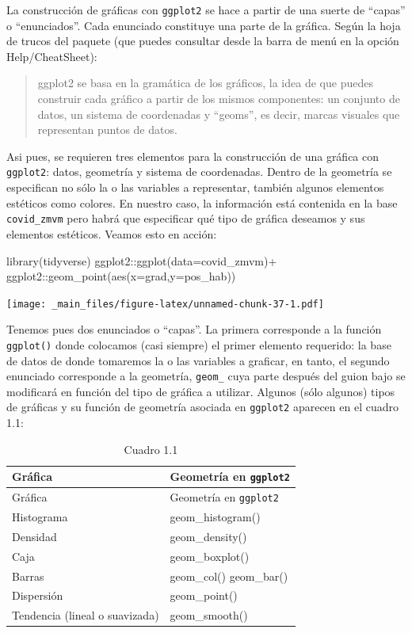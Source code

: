\documentclass[
  11pt,
  oneside]{book}
\newenvironment{Shaded}{\begin{snugshade}}{\end{snugshade}}
\newcommand{\AttributeTok}[1]{\textcolor[rgb]{0.77,0.63,0.00}{#1}}
\newcommand{\FunctionTok}[1]{\textcolor[rgb]{0.00,0.00,0.00}{#1}}
\newcommand{\NormalTok}[1]{#1}
\newcommand{\SpecialCharTok}[1]{\textcolor[rgb]{0.00,0.00,0.00}{#1}}
\begin{document}
La construcción de gráficas con \texttt{ggplot2} se hace a partir de una suerte de ``capas'' o ``enunciados''. Cada enunciado constituye una parte de la gráfica. Según la hoja de trucos del paquete (que puedes consultar desde la barra de menú en la opción Help/CheatSheet):

\begin{quote}
ggplot2 se basa en la gramática de los gráficos, la idea de que puedes construir cada gráfico a partir de los mismos componentes: un conjunto de datos, un sistema de coordenadas y ``geoms'', es decir, marcas visuales que representan puntos de datos.
\end{quote}

Asi pues, se requieren tres elementos para la construcción de una gráfica con \texttt{ggplot2}: datos, geometría y sistema de coordenadas. Dentro de la geometría se especifican no sólo la o las variables a representar, también algunos elementos estéticos como colores. En nuestro caso, la información está contenida en la base \texttt{covid\_zmvm} pero habrá que especificar qué tipo de gráfica deseamos y sus elementos estéticos. Veamos esto en acción:

\begin{Shaded}
\begin{Highlighting}[]
\FunctionTok{library}\NormalTok{(tidyverse)}
\NormalTok{ggplot2}\SpecialCharTok{::}\FunctionTok{ggplot}\NormalTok{(}\AttributeTok{data=}\NormalTok{covid\_zmvm)}\SpecialCharTok{+}
\NormalTok{  ggplot2}\SpecialCharTok{::}\FunctionTok{geom\_point}\NormalTok{(}\FunctionTok{aes}\NormalTok{(}\AttributeTok{x=}\NormalTok{grad,}\AttributeTok{y=}\NormalTok{pos\_hab))}
\end{Highlighting}
\end{Shaded}

\texttt{[image: \_main\_files/figure-latex/unnamed-chunk-37-1.pdf]}

Tenemos pues dos enunciados o ``capas''. La primera corresponde a la función \texttt{ggplot()} donde colocamos (casi siempre) el primer elemento requerido: la base de datos de donde tomaremos la o las variables a graficar, en tanto, el segundo enunciado corresponde a la geometría, \texttt{geom\_} cuya parte después del guion bajo se modificará en función del tipo de gráfica a utilizar. Algunos (sólo algunos) tipos de gráficas y su función de geometría asociada en \texttt{ggplot2} aparecen en el cuadro 1.1:

\begin{longtable}[]{@{}ll@{}}
\caption{Cuadro 1.1}\tabularnewline
\toprule()
Gráfica & Geometría en \texttt{ggplot2} \\
\midrule()
\endfirsthead
\toprule()
Gráfica & Geometría en \texttt{ggplot2} \\
\midrule()
\endhead
Histograma & geom\_histogram() \\
Densidad & geom\_density() \\
Caja & geom\_boxplot() \\
Barras & geom\_col() geom\_bar() \\
Dispersión & geom\_point() \\
Tendencia (lineal o suavizada) & geom\_smooth() \\
\bottomrule()
\end{longtable}
\end{document}
